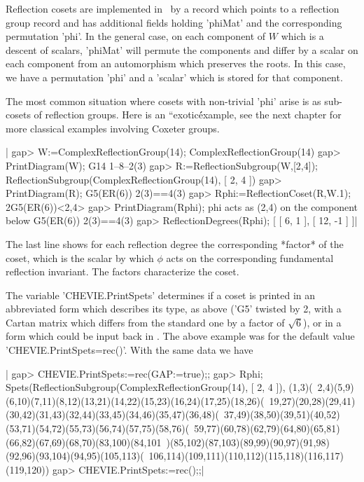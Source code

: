 Reflection cosets are implemented in \CHEVIE\ by a record which points to a
reflection  group record and has additional fields holding 'phiMat' and the
corresponding  permutation 'phi'. In the general case, on each component of
$W$ which is a descent of scalars, 'phiMat' will permute the components and
differ  by a scalar on each  component from an automorphism which preserves
the  roots. In this case, we have  a permutation 'phi' and a 'scalar' which
is stored for that component.

The  most common situation where cosets  with non-trivial 'phi' arise is as
sub-cosets  of reflection groups. Here is  an ``exotic\'\' example, see the
next chapter for more classical examples involving Coxeter groups.

|    gap> W:=ComplexReflectionGroup(14);
    ComplexReflectionGroup(14)
    gap> PrintDiagram(W);
    G14 1--8--2(3)
    gap> R:=ReflectionSubgroup(W,[2,4]);
    ReflectionSubgroup(ComplexReflectionGroup(14), [ 2, 4 ])
    gap> PrintDiagram(R);
    G5(ER(6)) 2(3)==4(3)
    gap> Rphi:=ReflectionCoset(R,W.1);
    2G5(ER(6))<2,4>
    gap> PrintDiagram(Rphi);
    phi acts as (2,4) on the component below
    G5(ER(6)) 2(3)==4(3)
    gap> ReflectionDegrees(Rphi);
    [ [ 6, 1 ], [ 12, -1 ] ]|

The  last line shows for each  reflection degree the corresponding *factor*
of the coset, which is the scalar by which $\phi$ acts on the corresponding
fundamental reflection invariant. The factors characterize the coset.

The  variable 'CHEVIE.PrintSpets'  determines if  a coset  is printed in an
abbreviated  form which  describes its  type, as  above ('G5' twisted by 2,
with  a Cartan matrix  which differs from  the standard one  by a factor of
$\sqrt  6$), or in  a form which  could be input  back in {\GAP}. The above
example  was for the default value 'CHEVIE.PrintSpets=rec()'. With the same
data we have\:

|    gap> CHEVIE.PrintSpets:=rec(GAP:=true);;
    gap> Rphi;
    Spets(ReflectionSubgroup(ComplexReflectionGroup(14), [ 2, 4 ]), (1,3)(\
    2,4)(5,9)(6,10)(7,11)(8,12)(13,21)(14,22)(15,23)(16,24)(17,25)(18,26)(\
    19,27)(20,28)(29,41)(30,42)(31,43)(32,44)(33,45)(34,46)(35,47)(36,48)(\
    37,49)(38,50)(39,51)(40,52)(53,71)(54,72)(55,73)(56,74)(57,75)(58,76)(\
    59,77)(60,78)(62,79)(64,80)(65,81)(66,82)(67,69)(68,70)(83,100)(84,101\
    )(85,102)(87,103)(89,99)(90,97)(91,98)(92,96)(93,104)(94,95)(105,113)(\
    106,114)(109,111)(110,112)(115,118)(116,117)(119,120))
    gap> CHEVIE.PrintSpets:=rec();;|

